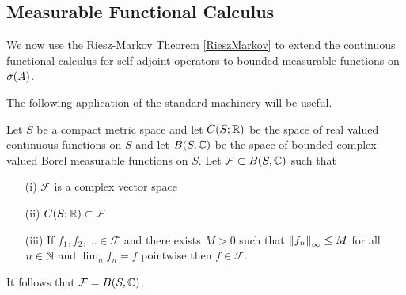 \subsection{Measurable Functional Calculus}

We now use the Riesz-Markov Theorem \ref{RieszMarkov} to extend the continuous functional calculus for self adjoint operators to bounded measurable functions on $\sigma(A)$.

The following application of the standard machinery will be useful.

\begin{lem}\label{hilbert:ContinuousToMeasurable}Let $S$ be a compact metric space and let $C(S; \mathbb{R})$ be the space of real valued continuous functions on $S$ and let $B(S, \mathbb{C})$ be the space of bounded complex valued Borel measurable functions on $S$.  Let $\mathcal{F} \subset B(S, \mathbb{C})$ such that 
\begin{itemize}
\item[(i)] $\mathcal{F}$ is a complex vector space
\item[(ii)] $C(S; \mathbb{R}) \subset \mathcal{F}$ 
\item[(iii)] If $f_1, f_2, \dotsc \in \mathcal{F}$ and there exists $M>0$ such that $\left \lVert f_n \right \rVert_\infty \leq M$ for all $n \in \mathbb{N}$ and $\lim_n f_n = f$ pointwise then $f \in \mathcal{F}$.
\end{itemize}
It follows that $\mathcal{F} = B(S, \mathbb{C})$.
\end{lem}
